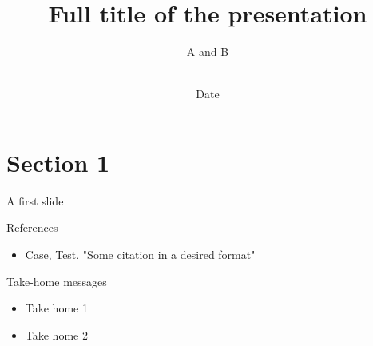 \documentclass{beamer}
\title[Footer Caption \hspace{3mm} Short title \hspace{1.5em} \insertframenumber\ of \inserttotalframenumber]
{Full title of the presentation}
\author[Author A, Author B]
{A and B \\ \vspace{3mm} \\}
\date{Date}
\institute[The University of Iowa]
{The University of Iowa, College of (Fill in)}
\begin{document}
\frame{\titlepage}


\section{Section 1}

\begin{frame}{A first slide}



\end{frame}

\begin{frame}{References}
    \begin{itemize}
        \item Case, Test. "Some citation in a desired format" 
    \end{itemize}
\end{frame}
\begin{frame}{Take-home messages}
    \begin{itemize}
        
        \item Take home 1
        
        \item Take home 2 
    \end{itemize}
    
\end{frame}    

\end{document}
